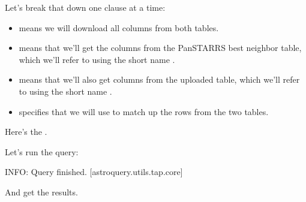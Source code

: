 \documentclass[letterpaper,10pt,english]{sphinxmanual}
\begin{document}
Let’s break that down one clause at a time:
\begin{itemize}
\item {} 
 means we will download all columns from both tables.

\item {} 
 means that we’ll get the columns from the Pan\sphinxhyphen{}STARRS best neighbor table, which we’ll refer to using the short name .

\item {} 
 means that we’ll also get columns from the uploaded table, which we’ll refer to using the short name .

\item {} 
 specifies that we will use  to match up the rows from the two tables.

\end{itemize}

Here’s the .

Let’s run the query:

\begin{sphinxVerbatim}[commandchars=\\\{\}]
   
\end{sphinxVerbatim}

\begin{sphinxVerbatim}[commandchars=\\\{\}]
INFO: Query finished. [astroquery.utils.tap.core]
\end{sphinxVerbatim}

And get the results.
\end{document}
